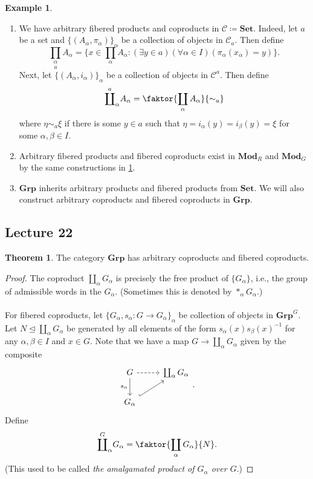 \documentclass[10pt,letterpaper,cm]{nupset}
\theoremstyle{definition}
\newtheorem{exmp}[definition]{Example}
\theoremstyle{theorem}
\newtheorem{theorem}[definition]{Theorem}
\theoremstyle{remark}
\newcommand{\1}{\mathbf{1}}
\renewcommand{\c}{\mathscr{C}}
\newcommand{\0}{\vec 0}
\begin{document}
\begin{exmp}\label{ex32} $ $
\begin{enumerate}
\item We have arbitrary fibered products and coproducts in $\c\coloneqq  \mathbf{Set}$. Indeed, let $a$ be a set and $\{(A_{\alpha}, \pi_{\alpha})\}_{\alpha}$ be a collection of objects in $\c_a$. Then define $$\underset{a}{\prod_{\alpha}} A_{\alpha} = \{x \in \prod_{\alpha} A_{\alpha} :  (\exists y \in a)(\forall \alpha \in I)(\pi_{\alpha}(x_{\alpha}) = y)\}.$$ Next, let $\{(A_{\alpha}, i_{\alpha})\}_{\alpha}$ be a collection of objects in $\c^a$. Then define $$ 
\overset{a}{\coprod}_{\alpha}A_{\alpha} = \faktor{\coprod_{\alpha} A_{\alpha}}{\sim_a}$$ where $\eta \sim_a \xi$ if there is some $y \in a$ such that $\eta = i_{\alpha}(y) = i_{\beta}(y) = \xi$ for some $\alpha, \beta \in I$.
\item Arbitrary fibered products and fibered coproducts exist in $\mathbf{Mod}_R$ and $\mathbf{Mod}_G$ by the same constructions in \cref{ex32}.
\item $\mathbf{Grp}$ inherits arbitrary products and fibered products from $\mathbf{Set}$. We will also construct arbitrary coproducts and fibered coproducts in $\mathbf{Grp}$. 
\end{enumerate}
\end{exmp}

\subsection{Lecture 22}

\begin{theorem}
The category $\mathbf{Grp}$ has arbitrary coproducts and fibered coproducts.
\end{theorem}
\begin{proof}
The coproduct $\coprod_{\alpha} G_{\alpha}$ is precisely the free product of $\{G_{\alpha}\}$, i.e., the group of admissible words in the $G_{\alpha}$. (Sometimes this is denoted by $\ast_{\alpha} G_{\alpha}$.)
\\ \\ For fibered coproducts, let $\{G_{\alpha}, s_{\alpha} : G \to G_{\alpha}\}_{\alpha}$ be collection of objects in $\mathbf{Grp}^G$. Let $N \unlhd \coprod_{\alpha} G_{\alpha}$ be generated by all elements of the form $s_{\alpha}(x)s_{\beta}(x)^{-1}$ for any $\alpha, \beta \in I$ and $x\in G$. Note that we have a map $G \to \coprod_{\alpha} G_{\alpha}$ given by the composite
\[
\begin{tikzcd}
G \arrow[d, "s_{\alpha}"'] \arrow[r, dashed] & \coprod_{\alpha}G_{\alpha} \\
G_{\alpha} \arrow[ru, hook] & 
\end{tikzcd}
.\] Define $$\overset{G}{\coprod}_{\alpha} G_{\alpha} = \faktor{\coprod_{\alpha} G_{\alpha}}{N}.$$ (This used to be called \textit{the amalgamated product of $G_{\alpha}$ over $G$}.)
\end{proof}
\end{document}

